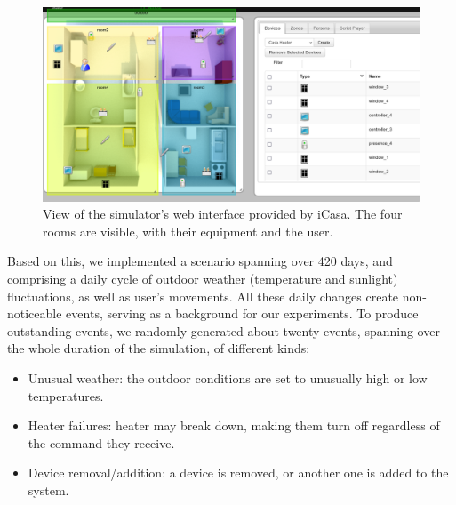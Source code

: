 \documentclass[entropy,article,submit,moreauthors,pdftex]{Definitions/mdpi}
\begin{document}
\begin{figure}[ht]
    \centering
    \includegraphics[width=.8\linewidth]{figures/simulator}
    \caption{View of the simulator's web interface provided by iCasa. The four
        rooms are visible, with their equipment and the user.}
    \label{fig:view}
\end{figure}

Based on this, we implemented a scenario spanning over 420 days, and
comprising a daily cycle of outdoor weather (temperature and sunlight) fluctuations, as well
as user's movements. All these daily changes create non-noticeable events,
serving as a background for our experiments. To produce outstanding
events, we randomly generated about twenty events, spanning over the whole
duration of the simulation, of different kinds:

\begin{itemize}
    \item Unusual weather: the outdoor conditions are set to unusually high or
          low temperatures.
    \item Heater failures: heater may break down, making them turn off regardless
          of the command they receive.
    \item Device removal/addition: a device is removed, or another one is added
          to the system.
\end{itemize}
\end{document}
